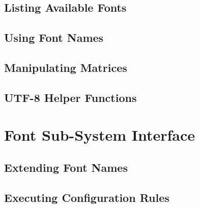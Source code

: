 \documentclass[10pt]{article}
\begin{document}
\subsection				{Listing Available Fonts}

\subsection				{Using Font Names}

\subsection				{Manipulating Matrices}

\subsection				{UTF-8 Helper Functions}

\section				{Font Sub-System Interface}

\subsection				{Extending Font Names}

\subsection				{Executing Configuration Rules}
\end{document}
